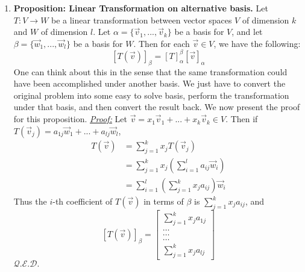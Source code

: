 \documentclass[oneside, 12pt]{book}
\newcommand{\settag}[1]{\renewcommand{\theenumi}{#1}}
\newcommand{\qed}{\hfill $\mathcal{Q}.\mathcal{E}.\mathcal{D}.$}
\newcommand{\tbf}[1]{\textbf{#1}}
\newcommand{\tit}[1]{\textit{#1}}
\begin{document}
\begin{enumerate}
        \settag{2.2.15}
        \item \tbf{Proposition: Linear Transformation on alternative basis.} Let $T:V\xrightarrow{} W$ be a linear transformation between vector spaces $V$ of dimension $k$ and $W$ of dimension $l$. Let $\alpha = \{\vec{v}_1,...,\vec{v}_k\}$ be a basis for $V$, and let $\beta = \{\vec{w}_1,...,\vec{w}_l\}$ be a basis for $W$. Then for each $\vec{v} \in V$, we have the following:
        \begin{equation*}
            \left[T(\vec{v})\right]_\beta = \left[T\right]^\beta_\alpha\left[\vec{v}\right]_\alpha
        \end{equation*}
        One can think about this in the sense that the same transformation could have been accomplished under another basis. We just have to convert the original problem into some easy to solve basis, perform the transformation under that basis, and then convert the result back. We now present the proof for this proposition.\newline
        \tit{\underline{Proof:}} Let $\vec{v}=x_1\vec{v}_1 + ... + x_k\vec{v}_k\in V$. Then if $T(\vec{v}_j)=a_{1j}\vec{w}_1 + ... + a_{lj}\vec{w}_l$, 
        \begin{align*}
            T(\vec{v}) &= \sum_{j=1}^k x_j T(\vec{v}_j) \\
            &= \sum_{j=1}^k x_j \left(\sum_{i=1}^{l}a_{ij}\vec{w}_i\right) \\
            &= \sum_{i=1}^l\left(\sum_{j=1}^k x_j a_{ij} \right)\vec{w}_i
        \end{align*}
        Thus the $i$-th coefficient of $T(\vec{v})$ in terms of $\beta$ is $\sum_{j=1}^k x_j a_{ij}$, and
        \begin{equation*}
            \left[T(\vec{v})\right]_\beta = 
            \begin{bmatrix}\sum_{j=1}^kx_ja_{1j} \\ \dots \\ \dots \\ \dots \\ \sum_{j=1}^kx_ja_{lj}\end{bmatrix}
        \end{equation*}
        \qed
        

\end{enumerate}
\end{document}
